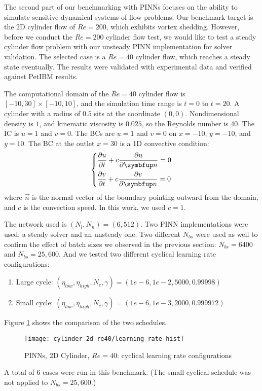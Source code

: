 The second part of our benchmarking with PINNs focuses on the ability to simulate sensitive dynamical systems of flow problems.
Our benchmark target is the 2D cylinder flow of $Re=200$, which exhibits vortex shedding.
However, before we conduct the $Re=200$ cylinder flow test, we would like to test a steady cylinder flow problem with our unsteady PINN implementation for solver validation.
The selected case is a $Re=40$ cylinder flow, which reaches a steady state eventually.
The results were validated with experimental data and verified against PetIBM results.

The computational domain of the $Re=40$ cylinder flow is $[-10, 30]\times[-10, 10]$, and the simulation time range is $t=0$ to $t=20$.
A cylinder with a radius of $0.5$ sits at the coordinate $(0, 0)$.
Nondimensional density is $1$, and kinematic viscosity is $0.025$, so the Reynolds number is $40$.
The IC is $u=1$ and $v=0$.
The BCs are $u=1$ and $v=0$ on $x=-10$, $y=-10$, and $y=10$.
The BC at the outlet $x=30$ is a 1D convective condition:
\begin{equation}\label{eq:convec-bc}
    \left\{
    \begin{aligned}
        &\pdiff{u}{t} + c\pdiff{u}{\vec{n}} = 0 \\
        &\pdiff{v}{t} + c\pdiff{v}{\vec{n}} = 0 \\
    \end{aligned}
    \right.
\end{equation}
where $\vec{n}$ is the normal vector of the boundary pointing outward from the domain, and $c$ is the convection speed.
In this work, we used $c=1$.

The network used is $(N_l, N_n)=(6, 512)$.
Two PINN implementations were used: a steady solver and an unsteady one.
Two different $N_{bs}$ were used as well to confirm the effect of batch sizes we observed in the previous section: $N_{bs}=6400$ and $N_{bs}=25,600$.
And we tested two different cyclical learning rate configurations:
\begin{enumerate}[nolistsep]
    \item Large cycle: $(\eta_{low}, \eta_{high}, N_c, \gamma)=(1e-6, 1e-2, 5000, 0.99998)$
    \item Small cycle: $(\eta_{low}, \eta_{high}, N_c, \gamma)=(1e-6, 1e-3, 2000, 0.999972)$
\end{enumerate}
Figure \ref{fig:cylinder-2d-re40-lr-hist} shows the comparison of the two schedules.
\begin{figure}[hbt!]
    \texttt{[image: cylinder-2d-re40/learning-rate-hist]}
    \caption[%
        PINNs, 2D Cylinder, $Re=40$: cyclical learning rate configurations%
    ]{%
        PINNs, 2D Cylinder, $Re=40$: cyclical learning rate configurations%
    }%
    \label{fig:cylinder-2d-re40-lr-hist}
\end{figure}
A total of 6 cases were run in this benchmark.
(The small cyclical schedule was not applied to $N_{bs}=25,600$.)

